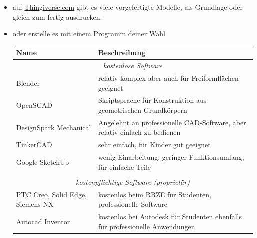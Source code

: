 \documentclass{\basedir/fablab-document}
\begin{document}
	\begin{itemize}
		\item auf \href{https://thingiverse.com}{Thingiverse.com} gibt es viele vorgefertigte Modelle, als
		Grundlage oder gleich zum fertig ausdrucken.
		\item oder erstelle es mit einem Programm deiner Wahl
		\begin{table}[H]
			\centering
			\begin{tabularx}{\textwidth}{|l|X|}
				\hline \textbf{Name} & \textbf{Beschreibung} \\
				\hline \multicolumn{2}{|c|}{\textit{kostenlose Software}}  \\
				\hline Blender & relativ komplex aber auch für Freiformflächen geeignet  \\
				\hline OpenSCAD & Skriptsprache für Konstruktion aus geometrischen Grundkörpern \\
				\hline DesignSpark Mechanical & Angelehnt an professionelle CAD-Software, aber relativ einfach zu bedienen  \\
				\hline TinkerCAD & sehr einfach, für Kinder gut geeignet  \\
				\hline Google SketchUp & wenig Einarbeitung, geringer Funktionsumfang, für einfache Teile \\
				\hline & \\
				\hline \multicolumn{2}{|c|}{\textit{kostenpflichtige Software (proprietär)}}  \\
				\hline PTC Creo, Solid Edge, Siemens NX & kostenlos beim RRZE für Studenten, professionelle Software \\
				\hline Autocad Inventor & kostenlos bei Autodesk für Studenten ebenfalls für professionelle Anwendungen \\
				\hline
			\end{tabularx}
		\end{table}
	\end{itemize}
	
\end{document}
